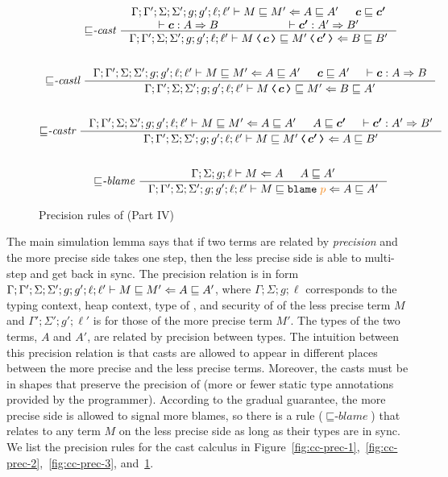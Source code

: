 \begin{figure}[tbp]
\raggedright
  {\small
  \begin{gather*}
  {\sqsubseteq}\textit{-cast}~
  \inference
  {\precctx{\Gamma}{\Gamma'}{\Sigma}{\Sigma'}{g}{g'}{\ell}{\ell'}\ccprec{M}{M'}{A}{A'} & \bm{c} \sqsubseteq \bm{c'} \\
   \vdash \bm{c} : A \Rightarrow B & \vdash \bm{c'} : A' \Rightarrow B'}
  {\precctx{\Gamma}{\Gamma'}{\Sigma}{\Sigma'}{g}{g'}{\ell}{\ell'}\ccprec{\cccast{M}{\bm{c}}}{\cccast{M'}{\bm{c'}}}{B}{B'}}
  \\[4ex]
  {\sqsubseteq}\textit{-castl}~
  \inference
  {\precctx{\Gamma}{\Gamma'}{\Sigma}{\Sigma'}{g}{g'}{\ell}{\ell'}\ccprec{M}{M'}{A}{A'} &
   \bm{c} \sqsubseteq A' & \vdash \bm{c} : A \Rightarrow B}
  {\precctx{\Gamma}{\Gamma'}{\Sigma}{\Sigma'}{g}{g'}{\ell}{\ell'}\ccprec{\cccast{M}{\bm{c}}}{M'}{B}{A'}}
  \\[4ex]
  {\sqsubseteq}\textit{-castr}~
  \inference
  {\precctx{\Gamma}{\Gamma'}{\Sigma}{\Sigma'}{g}{g'}{\ell}{\ell'}\ccprec{M}{M'}{A}{A'} &
   A \sqsubseteq \bm{c'} & \vdash \bm{c'} : A' \Rightarrow B'}
  {\precctx{\Gamma}{\Gamma'}{\Sigma}{\Sigma'}{g}{g'}{\ell}{\ell'}\ccprec{M}{\cccast{M'}{\bm{c'}}}{A}{B'}}
  \\[4ex]
  {\sqsubseteq}\textit{-blame}~
  \inference
  {\Gamma; \Sigma; g; \ell \vdash M \Leftarrow A & A \sqsubseteq A'}
  {\precctx{\Gamma}{\Gamma'}{\Sigma}{\Sigma'}{g}{g'}{\ell}{\ell'}\ccprec{M}{\blame{p}}{A}{A'}}
  \end{gather*}}
  \caption{Precision rules of \CC (Part IV)}
  \label{fig:cc-prec-4}
\end{figure}

The main simulation lemma says that if two terms are related by
\textit{precision} and the more precise side takes one step, then the less
precise side is able to multi-step and get back in sync. The precision relation
is in form
${\Gamma};{\Gamma'};{\Sigma};{\Sigma'};{g};{g'};{\ell};{\ell'}\vdash{M}\sqsubseteq{M'}\Leftarrow{A}\sqsubseteq{A'}$,
where $\Gamma;\Sigma;g;\ell$ corresponds to the typing context, heap context,
type of \PC, and security of \PC of the less precise term $M$ and
$\Gamma';\Sigma';g';\ell'$ is for those of the more precise term $M'$. The types
of the two terms, $A$ and $A'$, are related by precision between types. The
intuition between this precision relation is that casts are allowed to appear in
different places between the more precise and the less precise \CC terms.
Moreover, the casts must be in shapes that preserve the precision of \Surface
(more or fewer static type annotations provided by the programmer). According to
the gradual guarantee, the more precise side is allowed to signal more blames,
so there is a rule (${\sqsubseteq}\textit{-blame}$) that relates  to
any term $M$ on the less precise side as long as their types are in sync. We
list the precision rules for the cast calculus \CC in
Figure~\ref{fig:cc-prec-1},~\ref{fig:cc-prec-2},~\ref{fig:cc-prec-3},
and~\ref{fig:cc-prec-4}.

